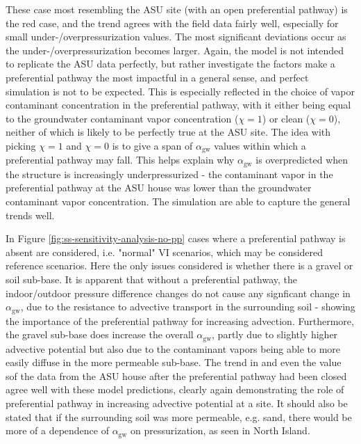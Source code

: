 \documentclass[journal=esthag,manuscript=article]{achemso}
\begin{document}
These case most resembling the ASU site (with an open preferential pathway) is the red case, and the trend agrees with the field data fairly well, especially for small under-/overpressurization values.
The most significant deviations occur as the under-/overpressurization becomes larger.
Again, the model is not intended to replicate the ASU data perfectly, but rather investigate the factors make a preferential pathway the most impactful in a general sense, and perfect simulation is not to be expected.
This is especially reflected in the choice of vapor contaminant concentration in the preferential pathway, with it either being equal to the groundwater contaminant vapor concentration ($\chi=1$) or clean ($\chi=0$), neither of which is likely to be perfectly true at the ASU site.
The idea with picking $\chi=1$ and $\chi=0$ is to give a span of $\alpha_\mathrm{gw}$ values within which a preferential pathway may fall.
This helps explain why $\alpha_\mathrm{gw}$ is overpredicted when the structure is increasingly underpressurized - the contaminant vapor in the preferential pathway at the ASU house was lower than the groundwater contaminant vapor concentration.
The simulation are able to capture the general trends well.\par

In Figure \ref{fig:ss-sensitivity-analysis-no-pp} cases where a preferential pathway is absent are considered, i.e. "normal" VI scenarios, which may be considered reference scenarios.
Here the only issues considered is whether there is a gravel or soil sub-base.
It is apparent that without a preferential pathway, the indoor/outdoor pressure difference changes do not cause any signficant change in $\alpha_\mathrm{gw}$, due to the resistance to advective transport in the surrounding soil - showing the importance of the preferential pathway for increasing advection.
Furthermore, the gravel sub-base does increase the overall $\alpha_\mathrm{gw}$, partly due to slightly higher advective potential but also due to the contaminant vapors being able to more easily diffuse in the more permeable sub-base.
The trend in and even the value sof the data from the ASU house after the preferential pathway had been closed agree well with these model predictions, clearly again demonstrating the role of preferential pathway in increasing advective potential at a site.
It should also be stated that if the surrounding soil was more permeable, e.g. sand, there would be more of a dependence of $\alpha_\mathrm{gw}$ on pressurization, as seen in North Island.\par
\end{document}
